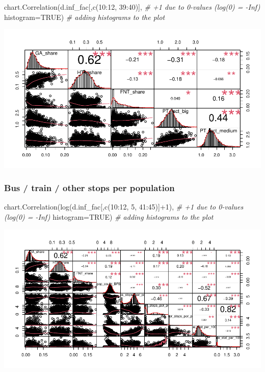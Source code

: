 \documentclass[
]{article}
\newenvironment{Shaded}{\begin{snugshade}}{\end{snugshade}}
\newcommand{\AttributeTok}[1]{\textcolor[rgb]{0.77,0.63,0.00}{#1}}
\newcommand{\CommentTok}[1]{\textcolor[rgb]{0.56,0.35,0.01}{\textit{#1}}}
\newcommand{\ConstantTok}[1]{\textcolor[rgb]{0.00,0.00,0.00}{#1}}
\newcommand{\DecValTok}[1]{\textcolor[rgb]{0.00,0.00,0.81}{#1}}
\newcommand{\FunctionTok}[1]{\textcolor[rgb]{0.00,0.00,0.00}{#1}}
\newcommand{\NormalTok}[1]{#1}
\newcommand{\SpecialCharTok}[1]{\textcolor[rgb]{0.00,0.00,0.00}{#1}}
\begin{document}
\begin{Shaded}
\begin{Highlighting}[]
\FunctionTok{chart.Correlation}\NormalTok{(d.inf\_fac[,}\FunctionTok{c}\NormalTok{(}\DecValTok{10}\SpecialCharTok{:}\DecValTok{12}\NormalTok{, }\DecValTok{39}\SpecialCharTok{:}\DecValTok{40}\NormalTok{)], }\CommentTok{\# +1 due to 0{-}values (log(0) = {-}Inf)}
                  \AttributeTok{histogram=}\ConstantTok{TRUE}\NormalTok{) }\CommentTok{\# adding histograms to the plot}
\end{Highlighting}
\end{Shaded}

\includegraphics{Lin_Mod_Clus_Analysis_files/figure-latex/unnamed-chunk-13-1.pdf}

\hypertarget{bus-train-other-stops-per-population}{%
\subsubsection{Bus / train / other stops per
population}\label{bus-train-other-stops-per-population}}

\begin{Shaded}
\begin{Highlighting}[]
\FunctionTok{chart.Correlation}\NormalTok{(}\FunctionTok{log}\NormalTok{(d.inf\_fac[,}\FunctionTok{c}\NormalTok{(}\DecValTok{10}\SpecialCharTok{:}\DecValTok{12}\NormalTok{, }\DecValTok{5}\NormalTok{, }\DecValTok{41}\SpecialCharTok{:}\DecValTok{45}\NormalTok{)]}\SpecialCharTok{+}\DecValTok{1}\NormalTok{), }\CommentTok{\# +1 due to 0{-}values (log(0) = {-}Inf)}
                  \AttributeTok{histogram=}\ConstantTok{TRUE}\NormalTok{) }\CommentTok{\# adding histograms to the plot}
\end{Highlighting}
\end{Shaded}

\includegraphics{Lin_Mod_Clus_Analysis_files/figure-latex/unnamed-chunk-14-1.pdf}
\end{document}
